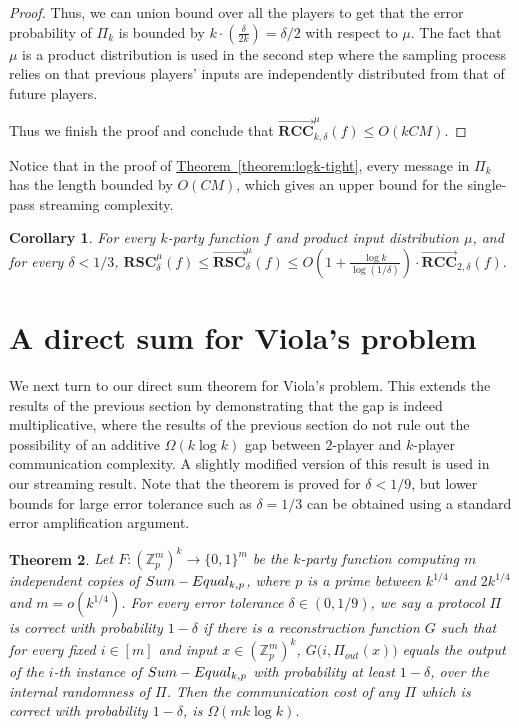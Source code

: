 \documentclass[11pt]{article}
\numberwithin{equation}{section}
\newtheorem{theorem}{Theorem}[section]
\newtheorem{corollary}[theorem]{Corollary}
\theoremstyle{definition}
\theoremstyle{plain}
\newcommand{\Z}{\mathbb Z}
\newcommand{\expref}[2]{\hyperref[#2]{#1~\ref{#2}}}
\newcommand{\zo}{\ensuremath{ \{ 0, 1 \} }}
\newcommand{\error}{\ensuremath{\delta}}
\newcommand{\bigo}[1]{\ensuremath{{{O} \left( {#1} \right)}}}
\newcommand{\bigomega}[1]{\ensuremath{{\Omega \left( {#1} \right)}}}
\newcommand{\rsc}{\ensuremath{\mathbf{RSC}}}
\newcommand{\rccone}{\ensuremath{\overrightarrow{\mathbf{RCC}}}}
\newcommand{\rscone}{\ensuremath{\overrightarrow{\mathbf{RSC}}}}
\newcommand{\sumequal}{\textsc{Sum-Equal} }
\begin{document}
\begin{proof}
Thus, we can union bound over all the players to get that the error probability of $\Pi_k$ is bounded by $k\cdot (\frac{\error}{2k})=\error/2$ with respect to $\mu$.
The fact that $\mu$ is a product distribution is used in the second step where the sampling process relies on that previous players' inputs are independently distributed from that of future players.

Thus we finish the proof and conclude that 
$\rccone_{k,\error}^{\mu}(f)\le \bigo{kCM}$.
\end{proof}


Notice that in the proof of \expref{Theorem}{theorem:logk-tight}, every message in $\Pi_k$ has the length bounded by $\bigo{CM}$, which gives an upper bound for the single-pass streaming complexity.

\begin{corollary}\label{corollary:separation upper bound}
For every $k$-party function $f$ and product input distribution $\mu$, and for every $\error < 1/3$, 
$\rsc_{\error}^{\mu}(f) \le\rscone_{\error}^{\mu}(f) \le  \bigo{1+\frac{\log k}{\log(1/\error)}} \cdot \rccone_{2,\error}(f).$
\end{corollary}

\section{A direct sum for Viola's problem}
We next turn to our direct sum theorem for Viola's problem. {\color{black}This extends the results of the previous section by demonstrating that the gap is indeed multiplicative, where the results of the previous section do not rule out the possibility of an additive $\Omega(k \log k)$ gap between $2$-player and $k$-player communication complexity. A slightly modified version of this result is used in our streaming result.}
Note that the theorem is proved for $\error < 1/9$, but lower bounds for large error tolerance such as $\error=1/3$ can be obtained using a standard error amplification argument.

	\begin{theorem}\label{thm:A1}
		Let $F:\left(\Z_p^m\right)^k \to \zo^m$ be the $k$-party function computing $m$ independent copies of $\sumequal_{k,p}$, where $p$ is a prime between $k^{1/4}$ and $2k^{1/4}$ {\color{black}and $m = o(k^{1/4})$.}
		For every error tolerance $\error\in(0,1/9)$,  
        we say a protocol $\Pi$ is \emph{correct with probability $1-\error$}
		if there is a reconstruction
		function $G$ such that for every fixed $i \in [m]$ and input $x\in \left(\Z_p^m\right)^k$, $G\big(i, \Pi_{out}(x)\big)$ equals the
		output of the $i$-th instance of $\sumequal_{k,p}$ with probability at least
		$1-\error$, over the internal randomness of $\Pi$. 
		Then the communication cost of any $\Pi$ which is correct with probability $1-\error$, is $\bigomega{m k\log k}$.
	\end{theorem}
\end{document}
